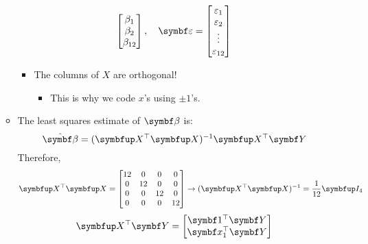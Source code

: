 \begin{itemize}
\begin{itemize}
\[\begin{bmatrix}
                                    \beta_1 \\
                                    \beta_2 \\
                                    \beta_{12}
                              \end{bmatrix},\quad\RandomVector{\varepsilon}=\begin{bmatrix}
                                    \varepsilon_1 \\
                                    \varepsilon_2 \\
                                    \vdots        \\
                                    \varepsilon_{12}
                              \end{bmatrix} \]
                        \begin{itemize}[*]
                              \item The columns of $ X $ are orthogonal!
                                    \begin{itemize}
                                          \item This is why we code $ x $'s using $ \pm 1 $'s.
                                    \end{itemize}
                        \end{itemize}
                  \item The least squares estimate of $ \Vector{\beta} $ is:
                        \[ \hat{\RandomVector{\beta}}=(\Matrix{X}^\top\Matrix{X})^{-1}\Matrix{X}^\top \RandomVector{Y} \]
                        Therefore,
                        \[ \Matrix{X}^\top\Matrix{X}=\begin{bmatrix}
                                    12 & 0  & 0  & 0  \\
                                    0  & 12 & 0  & 0  \\
                                    0  & 0  & 12 & 0  \\
                                    0  & 0  & 0  & 12
                              \end{bmatrix}\rightarrow
                              (\Matrix{X}^\top\Matrix{X})^{-1}=\frac{1}{12}\Matrix{I}_{4} \]
                        \[ \Matrix{X}^\top\RandomVector{Y}=\begin{bmatrix}
                                    \Vector{1}^\top \RandomVector{Y}   \\
                                    \Vector{x}_1^\top \RandomVector{Y} \\

\end{bmatrix}\]
\end{itemize}
\end{itemize}
